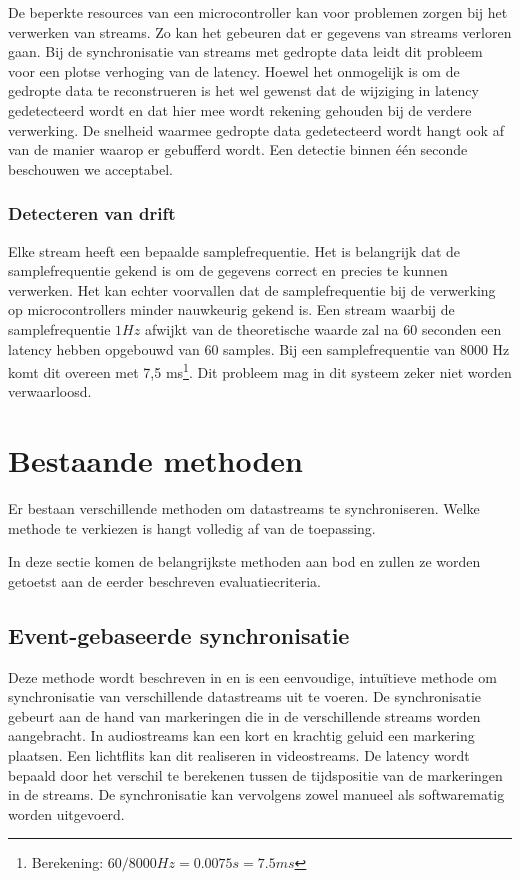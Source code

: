 De beperkte resources van een microcontroller kan voor problemen zorgen bij het verwerken van streams. Zo kan het gebeuren dat er gegevens van streams verloren gaan. Bij de synchronisatie van streams met gedropte data leidt dit probleem voor een plotse verhoging van de latency. Hoewel het onmogelijk is om de gedropte data te reconstrueren is het wel gewenst dat de wijziging in latency gedetecteerd wordt en dat hier mee wordt rekening gehouden bij de verdere verwerking. De snelheid waarmee gedropte data gedetecteerd wordt hangt ook af van de manier waarop er gebufferd wordt. Een detectie binnen één seconde beschouwen we acceptabel.

\subsubsection{Detecteren van drift}

Elke stream heeft een bepaalde samplefrequentie. Het is belangrijk dat de samplefrequentie gekend is om de gegevens correct en precies te kunnen verwerken. Het kan echter voorvallen dat de samplefrequentie bij de verwerking op microcontrollers minder nauwkeurig gekend is. Een stream waarbij de samplefrequentie $ 1Hz $ afwijkt van de theoretische waarde zal na 60 seconden een latency hebben opgebouwd van 60 samples. Bij een samplefrequentie van 8000 Hz komt dit overeen met 7,5 ms\footnote{Berekening: $ 60 / 8000 Hz = 0.0075 s = 7.5 ms $}. Dit probleem mag in dit systeem zeker niet worden verwaarloosd. 

\section{Bestaande methoden}
\label{bestaande-methoden}

Er bestaan verschillende methoden om datastreams te synchroniseren. Welke methode te verkiezen is hangt volledig af van de toepassing.

In deze sectie komen de belangrijkste methoden aan bod en zullen ze worden getoetst aan de eerder beschreven evaluatiecriteria. 

\subsection{Event-gebaseerde synchronisatie}

Deze methode wordt beschreven in \cite{bannach2009automatic, six2015multimodal} en is een eenvoudige, intuïtieve methode om synchronisatie van verschillende datastreams uit te voeren. De synchronisatie gebeurt aan de hand van markeringen die in de verschillende streams worden aangebracht. In audiostreams kan een kort en krachtig geluid een markering plaatsen. Een lichtflits kan dit realiseren in videostreams. De latency wordt bepaald door het verschil te berekenen tussen de tijdspositie van de markeringen in de streams. De synchronisatie kan vervolgens zowel manueel als softwarematig worden uitgevoerd.

